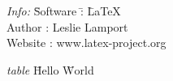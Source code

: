\documentclass{article}
\begin{document}
\begin{tabbing}
\emph{Info:} \= Software \= : \= \LaTeX \\ %
\> Author \> : \> Leslie Lamport \\ %
\> Website \> : \> www.latex-project.org


\end{tabbing}




\begin{tabbing}
  \emph{table} \= Hello \= World \\
    \\
   
  
\end{tabbing}
\end{document}

